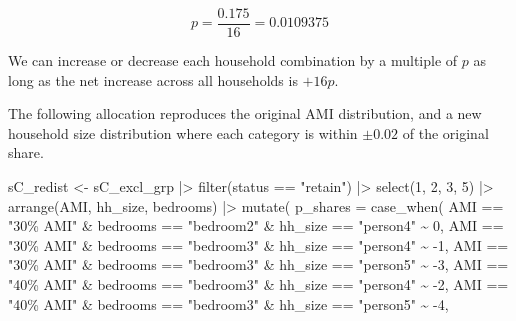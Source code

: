 \documentclass[
  10pt,
  letterpaper,
  DIV=11,
  numbers=noendperiod]{scrartcl}
\newenvironment{Shaded}{\begin{snugshade}}{\end{snugshade}}
\newcommand{\AttributeTok}[1]{\textcolor[rgb]{0.40,0.45,0.13}{#1}}
\newcommand{\DecValTok}[1]{\textcolor[rgb]{0.68,0.00,0.00}{#1}}
\newcommand{\FunctionTok}[1]{\textcolor[rgb]{0.28,0.35,0.67}{#1}}
\newcommand{\NormalTok}[1]{\textcolor[rgb]{0.00,0.23,0.31}{#1}}
\newcommand{\OtherTok}[1]{\textcolor[rgb]{0.00,0.23,0.31}{#1}}
\newcommand{\SpecialCharTok}[1]{\textcolor[rgb]{0.37,0.37,0.37}{#1}}
\newcommand{\StringTok}[1]{\textcolor[rgb]{0.13,0.47,0.30}{#1}}
\begin{document}
\[p = \frac{0.175}{16} = 0.0109375\]

We can increase or decrease each household combination by a multiple of
\(p\) as long as the net increase across all households is \(+16p\).

The following allocation reproduces the original AMI distribution, and a
new household size distribution where each category is within
\(\pm 0.02\) of the original share.

\begin{Shaded}
\begin{Highlighting}[]
\NormalTok{sC\_redist }\OtherTok{\textless{}{-}}\NormalTok{ sC\_excl\_grp }\SpecialCharTok{|\textgreater{}} 
  \FunctionTok{filter}\NormalTok{(status }\SpecialCharTok{==} \StringTok{"retain"}\NormalTok{) }\SpecialCharTok{|\textgreater{}} 
  \FunctionTok{select}\NormalTok{(}\DecValTok{1}\NormalTok{, }\DecValTok{2}\NormalTok{, }\DecValTok{3}\NormalTok{, }\DecValTok{5}\NormalTok{) }\SpecialCharTok{|\textgreater{}} 
  \FunctionTok{arrange}\NormalTok{(AMI, hh\_size, bedrooms) }\SpecialCharTok{|\textgreater{}} 
  \FunctionTok{mutate}\NormalTok{(}
    \AttributeTok{p\_shares =} \FunctionTok{case\_when}\NormalTok{(}
\NormalTok{      AMI }\SpecialCharTok{==} \StringTok{"30\% AMI"} \SpecialCharTok{\&}\NormalTok{ bedrooms }\SpecialCharTok{==} \StringTok{"bedroom2"} \SpecialCharTok{\&}\NormalTok{ hh\_size }\SpecialCharTok{==} \StringTok{"person4"} \SpecialCharTok{\textasciitilde{}} \DecValTok{0}\NormalTok{,}
\NormalTok{      AMI }\SpecialCharTok{==} \StringTok{"30\% AMI"} \SpecialCharTok{\&}\NormalTok{ bedrooms }\SpecialCharTok{==} \StringTok{"bedroom3"} \SpecialCharTok{\&}\NormalTok{ hh\_size }\SpecialCharTok{==} \StringTok{"person4"} \SpecialCharTok{\textasciitilde{}} \SpecialCharTok{{-}}\DecValTok{1}\NormalTok{,}
\NormalTok{      AMI }\SpecialCharTok{==} \StringTok{"30\% AMI"} \SpecialCharTok{\&}\NormalTok{ bedrooms }\SpecialCharTok{==} \StringTok{"bedroom3"} \SpecialCharTok{\&}\NormalTok{ hh\_size }\SpecialCharTok{==} \StringTok{"person5"} \SpecialCharTok{\textasciitilde{}} \SpecialCharTok{{-}}\DecValTok{3}\NormalTok{,}
\NormalTok{      AMI }\SpecialCharTok{==} \StringTok{"40\% AMI"} \SpecialCharTok{\&}\NormalTok{ bedrooms }\SpecialCharTok{==} \StringTok{"bedroom3"} \SpecialCharTok{\&}\NormalTok{ hh\_size }\SpecialCharTok{==} \StringTok{"person4"} \SpecialCharTok{\textasciitilde{}} \SpecialCharTok{{-}}\DecValTok{2}\NormalTok{,}
\NormalTok{      AMI }\SpecialCharTok{==} \StringTok{"40\% AMI"} \SpecialCharTok{\&}\NormalTok{ bedrooms }\SpecialCharTok{==} \StringTok{"bedroom3"} \SpecialCharTok{\&}\NormalTok{ hh\_size }\SpecialCharTok{==} \StringTok{"person5"} \SpecialCharTok{\textasciitilde{}} \SpecialCharTok{{-}}\DecValTok{4}\NormalTok{,}

\end{Highlighting}
\end{Shaded}
\end{document}

